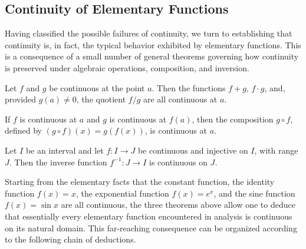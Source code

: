 

\subsection{Continuity of Elementary Functions}

Having classified the possible failures of continuity, we turn to establishing that continuity is, in fact, the typical behavior exhibited by elementary functions. This is a consequence of a small number of general theorems governing how continuity is preserved under algebraic operations, composition, and inversion.

\begin{theorem}
Let $f$ and $g$ be continuous at the point $a$. Then the functions $f + g$, $f \cdot g$, and, provided $g(a) \neq 0$, the quotient $f/g$ are all continuous at $a$.
\end{theorem}

\begin{theorem}
If $f$ is continuous at $a$ and $g$ is continuous at $f(a)$, then the composition $g \circ f$, defined by $(g \circ f)(x) = g(f(x))$, is continuous at $a$.
\end{theorem}

\begin{theorem}
Let $I$ be an interval and let $f : I \to J$ be continuous and injective on $I$, with range $J$. Then the inverse function $f^{-1} : J \to I$ is continuous on $J$.
\end{theorem}

Starting from the elementary facts that the constant function, the identity function $f(x) = x$, the exponential function $f(x) = e^x$, and the sine function $f(x) = \sin x$ are all continuous, the three theorems above allow one to deduce that essentially every elementary function encountered in analysis is continuous on its natural domain. This far-reaching consequence can be organized according to the following chain of deductions.

